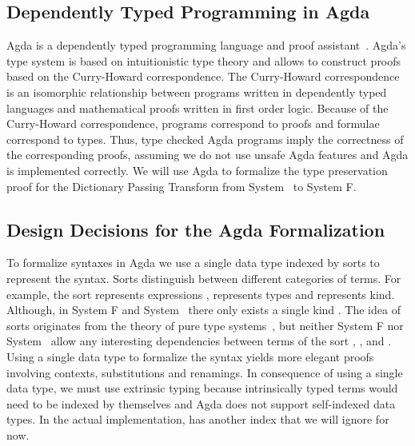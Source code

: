 \subsection{Dependently Typed Programming in Agda}
Agda is a dependently typed programming language and proof assistant~\cite{agda}.
Agda's type system is based on intuitionistic type theory and allows to construct proofs based on the Curry-Howard correspondence. 
The Curry-Howard correspondence is an isomorphic relationship between programs written in dependently typed languages and mathematical proofs written in first order logic. 
Because of the Curry-Howard correspondence, programs correspond to proofs and formulae correspond to types. 
Thus, type checked Agda programs imply the correctness of the corresponding proofs, assuming we do not use unsafe Agda features and Agda is implemented correctly. We will use Agda to formalize the type preservation proof for the Dictionary Passing Transform from System \Fo\ to System F.

\subsection{Design Decisions for the Agda Formalization}
To formalize syntaxes in Agda we use a single data type  indexed by sorts  to represent the syntax. 
Sorts distinguish between different categories of terms.
For example, the sort  represents expressions ,  represents types  and  represents kind. Although, in System F and System \Fo\ there only exists a single kind . The idea of sorts originates from the theory of pure type systems~\cite{pts}, but neither System F nor System \Fo\ allow any interesting dependencies between terms of the sort , , and .
Using a single data type to formalize the syntax yields more elegant proofs involving contexts, substitutions and renamings. 
In consequence of using a single data type, we must use extrinsic typing because intrinsically typed terms      would need to be indexed by themselves and Agda does not support self-indexed data types. 
In the actual implementation,  has another index  that we will ignore for now.

